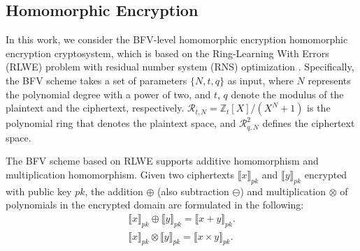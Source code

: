 \documentclass[conference]{IEEEtran}
\begin{document}
\begin{table}[h]
\begin{tabular}{cc}
\bottomrule
\end{tabular}
\end{table}

\subsection{Homomorphic Encryption}\label{HE}
In this work, we consider the BFV-level homomorphic encryption homomorphic encryption cryptosystem, which is based on the Ring-Learning With Errors (RLWE) problem with residual number system (RNS) optimization \cite{bajard2016full}. Specifically, the BFV scheme takes a set of parameters $\{N, t, q\}$ as input, where $N$ represents the polynomial degree with a power of two, and $t$, $q$ denote the modulus of the plaintext and the ciphertext, respectively. $\mathcal{R}_{t,N} = \mathbb{Z}_t [X]/(X^N + 1)$ is the polynomial ring that denotes the plaintext space, and $\mathcal{R}_{q, N}^2$ defines the ciphertext space.

The BFV scheme based on RLWE supports additive homomorphism and multiplication homomorphism. Given two ciphertexts $\llbracket x \rrbracket_{pk}$ and $\llbracket y \rrbracket_{pk}$ encrypted with public key $pk$, the addition $\oplus$ (also subtraction $\ominus$) and multiplication $\otimes$ of polynomials in the encrypted domain are formulated in the following:
\begin{equation*}
\begin{array}{c}
    \llbracket x \rrbracket_{pk} \oplus \llbracket y \rrbracket_{pk} = \llbracket x + y \rrbracket_{pk}. \\
    \llbracket x \rrbracket_{pk} \otimes \llbracket y \rrbracket_{pk} = \llbracket x \times y \rrbracket_{pk}.    
\end{array}
\end{equation*}
\end{document}

